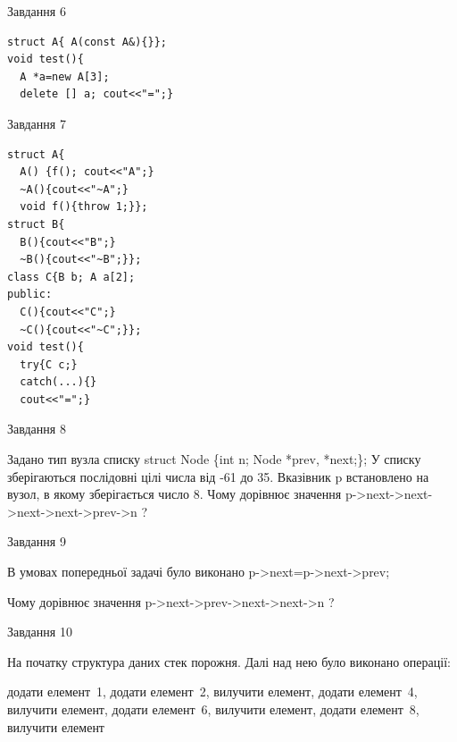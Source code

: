 \documentclass[12pt, ukrainian]{article}
\begin{document}
{{{{{{{{\begin{minipage}[t]{7cm}
               
{\begin{center}Завдання {6}\end{center}}
\vspace{-6mm}

\begin{verbatim}
struct A{ A(const A&){}};
void test(){
  A *a=new A[3]; 
  delete [] a; cout<<"=";} 
\end{verbatim}            


               
{\begin{center}Завдання {7}\end{center}}
\vspace{-6mm}

\begin{verbatim}
struct A{
  A() {f(); cout<<"A";}
  ~A(){cout<<"~A";} 
  void f(){throw 1;}};
struct B{
  B(){cout<<"B";}
  ~B(){cout<<"~B";}};
class C{B b; A a[2];
public:
  C(){cout<<"C";}
  ~C(){cout<<"~C";}};
void test(){
  try{C c;} 
  catch(...){} 
  cout<<"=";}
\end{verbatim}            


\end{minipage}
               
{\begin{center}Завдання {8}\end{center}}
\vspace{-6mm}
Задано тип вузла списку
struct Node \{int n; Node *prev, *next;\};
У списку зберігаються послідовні цілі числа від -61 до 35. Вказівник p встановлено на вузол, в якому зберігається число 8.
Чому дорівнює значення p->next->next->next->next->prev->n ?\par

               
{\begin{center}Завдання {9}\end{center}}
\vspace{-6mm}
В умовах попередньої задачі було виконано p->next=p->next->prev;

Чому дорівнює значення p->next->prev->next->next->n ?\par

\newpage
               
{\begin{center}Завдання {10}\end{center}}
\vspace{-6mm}
На початку структура даних стек порожня. Далі над нею було виконано операції:

додати елемент~1, додати елемент~2, вилучити елемент, додати елемент~4, вилучити елемент, додати елемент~6, вилучити елемент, додати елемент~8, вилучити елемент

}}}}}}}}
\end{document}
